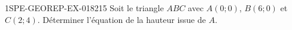 \begin{exercice}{1SPE-GEOREP-EX-018}{2}{15}
Soit le triangle $ABC$ avec $A(0 ; 0)$, $B(6 ; 0)$ et $C(2 ; 4)$. Déterminer l'équation de la hauteur issue de $A$.
\end{exercice}
